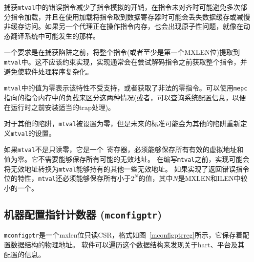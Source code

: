 {\begin{commentary}
捕获{\tt mtval}中的错误指令减少了指令模拟的开销，在指令未对齐时可能避免多次部分指令加载，并且在使用加载将指令取到数据寄存器时可能会丢失数据缓存或减慢非缓存访问。如果另一个代理正在操作指令内存，也会出现原子性问题，就像在动态翻译系统中可能发生的那样。

一个要求是在捕获陷阱之前，将整个指令(或者至少是第一个MXLEN位)提取到{\tt mtval}中。这不应该约束实现，实现通常会在尝试解码指令之前获取整个指令，并避免使软件处理程序复杂化。

{\tt mtval}中的值为零表示该特性不受支持，或者获取了非法的零指令。可以使用{\tt mepc}指向的指令内存中的负载来区分这两种情况(或者，可以查询系统配置信息，以便在运行时之前安装适当的trap处理)。
\end{commentary}

\iffalse
For other traps, {\tt mtval} is set to zero, but a future standard may
redefine {\tt mtval}'s setting for other traps.

If {\tt mtval} is not read-only zero, it is a \warl\ register that must be
able to hold all valid virtual addresses and the value zero.
It need not be capable of holding all
possible invalid addresses.
Prior to writing {\tt mtval}, implementations may convert an invalid address
into some other invalid address that {\tt mtval} is capable of holding.
If the feature to return the faulting instruction bits is implemented, {\tt
mtval} must also be able to hold all values less than $2^N$, where $N$ is the
smaller of MXLEN and ILEN.
\fi
对于其他的陷阱，{\tt mtval}被设置为零，但是未来的标准可能会为其他的陷阱重新定义{\tt mtval}的设置。

如果{\tt mtval}不是只读零，它是一个\warl\ 寄存器，必须能够保存所有有效的虚拟地址和值为零。它不需要能够保存所有可能的无效地址。
在编写{\tt mtval}之前，实现可能会将无效地址转换为{\tt mtval}能够持有的其他一些无效地址。
如果实现了返回错误指令位的特性，{\tt mtval}还必须能够保存所有小于$2^N$的值，其中$N$是MXLEN和ILEN中较小的一个。

\subsection{机器配置指针计数器 ({\tt mconfigptr})}

\iffalse
{\tt mconfigptr} is an MXLEN-bit read-only CSR, formatted as shown in
Figure~\ref{mconfigptrreg}, that holds the physical address of a configuration
data structure.
Software can traverse this data structure to discover information about
the harts, the platform, and their configuration.
\fi
{\tt mconfigptr}是一个mxlen位只读CSR，格式如图~\ref{mconfigptrreg}所示，它保存着配置数据结构的物理地址。
软件可以遍历这个数据结构来发现关于hart、平台及其配置的信息。


}
